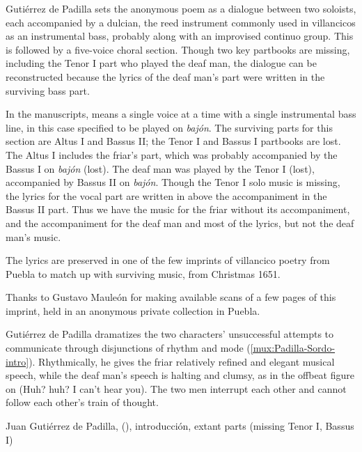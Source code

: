 Gutiérrez de Padilla sets the anonymous poem as a dialogue between two soloists,
each accompanied by a dulcian, the reed instrument commonly used in villancicos
as an instrumental bass, probably along with an improvised continuo group.
This is followed by a five-voice choral section.
Though two key partbooks are missing, including the Tenor I part who played the
deaf man, the dialogue can be reconstructed because the lyrics of the deaf man's
part were written in the surviving bass part.%
\begin{Footnote}
    In the manuscripts,  means a single voice at a time with a single
    instrumental bass line, in this case specified to be played on \emph{bajón}.  
    The surviving parts for this section are Altus I and Bassus II; the Tenor I
    and Bassus I partbooks are lost.
    The Altus I includes the friar's part, which was probably accompanied by the
    Bassus I on \emph{bajón} (lost).  
    The deaf man was played by the Tenor I (lost), accompanied by Bassus II on
    \emph{bajón}.
    Though the Tenor I solo music is missing, the lyrics for the vocal part are
    written in above the accompaniment in the Bassus II part.  
    Thus we have the music for the friar without its accompaniment, and the
    accompaniment for the deaf man and most of the lyrics, but not the deaf
    man's music.
\end{Footnote}
The lyrics are preserved in one of the few imprints of villancico poetry from
Puebla to match up with surviving music, from Christmas 1651.%
\begin{Footnote}
    Thanks to Gustavo Mauleón for making available scans of a few pages of this
    imprint, held in an anonymous private collection in Puebla.
\end{Footnote}
Gutiérrez de Padilla dramatizes the two characters' unsuccessful attempts to
communicate through disjunctions of rhythm and mode
(\cref{mux:Padilla-Sordo-intro}).
Rhythmically, he gives the friar relatively refined and elegant musical speech,
while the deaf man's speech is halting and clumsy, as in the offbeat figure on
 (Huh? huh? I can't hear you).
The two men interrupt each other and cannot follow each other's train of
thought.

{Juan Gutiérrez de Padilla, 
(), introducción, extant parts (missing Tenor I, Bassus
I)}

